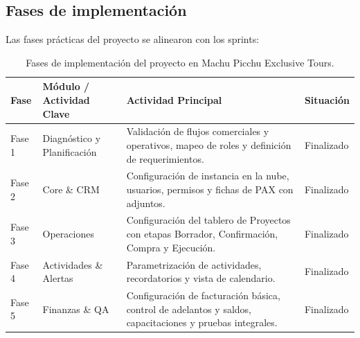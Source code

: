 \subsection{Fases de implementación}

Las fases prácticas del proyecto se alinearon con los sprints:

\begin{table}[h]
\centering
\renewcommand{\arraystretch}{1.5}
\begin{tabular}{|l|p{4cm}|p{6cm}|p{3cm}|}
\hline
\textbf{Fase} & \textbf{Módulo / Actividad Clave} & \textbf{Actividad Principal} & \textbf{Situación} \\ \hline
Fase 1 & Diagnóstico y Planificación & Validación de flujos comerciales y operativos, mapeo de roles y definición de requerimientos. & Finalizado \\ \hline
Fase 2 & Core \& CRM & Configuración de instancia en la nube, usuarios, permisos y fichas de PAX con adjuntos. & Finalizado \\ \hline
Fase 3 & Operaciones & Configuración del tablero de Proyectos con etapas Borrador, Confirmación, Compra y Ejecución. & Finalizado \\ \hline
Fase 4 & Actividades \& Alertas & Parametrización de actividades, recordatorios y vista de calendario. & Finalizado \\ \hline
Fase 5 & Finanzas \& QA & Configuración de facturación básica, control de adelantos y saldos, capacitaciones y pruebas integrales. & Finalizado \\ \hline
\end{tabular}
\caption{Fases de implementación del proyecto en Machu Picchu Exclusive Tours.}
\end{table}

